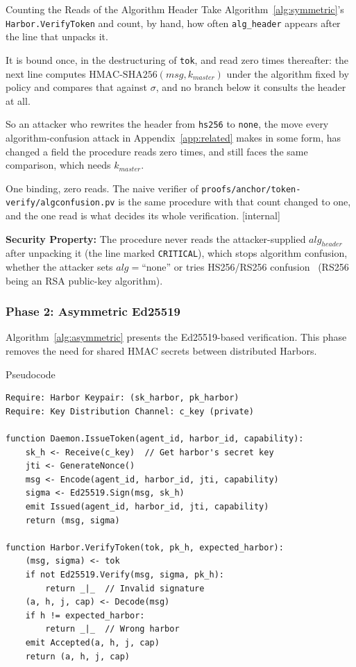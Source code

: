 \documentclass[11pt,a4paper]{article}
\theoremstyle{definition}
\begin{document}
\begin{pdexample}{Counting the Reads of the Algorithm Header}
\setlength{\parskip}{4pt plus 1pt}
Take Algorithm~\ref{alg:symmetric}'s \texttt{Harbor.VerifyToken} and count, by
hand, how often \texttt{alg\_header} appears after the line that unpacks it.

It is bound once, in the destructuring of \texttt{tok}, and read zero times
thereafter: the next line computes $\mathrm{HMAC\text{-}SHA256}(\mathit{msg},
k_{\mathit{master}})$ under the algorithm fixed by policy and compares that
against $\sigma$, and no branch below it consults the header at all.

So an
attacker who rewrites the header from \texttt{hs256} to \texttt{none}, the
move every algorithm-confusion attack in Appendix~\ref{app:related} makes in
some form, has changed a field the procedure reads zero times, and still faces
the same comparison, which needs $k_{\mathit{master}}$.

One binding, zero reads. The naive verifier of
\texttt{proofs/anchor/token-verify/}\allowbreak\texttt{algconfusion.pv} is the same procedure with
that count changed to one, and the one read is what decides its whole
verification. [internal]
\end{pdexample}

\textbf{Security Property:} The procedure never reads the attacker-supplied $alg_{header}$ after unpacking it (the line marked \texttt{CRITICAL}), which stops algorithm confusion, whether the attacker sets $alg = \text{``none''}$ or tries HS256/RS256 confusion~ (RS256 being an RSA public-key algorithm).

\subsubsection{Phase 2: Asymmetric Ed25519}

Algorithm~\ref{alg:asymmetric} presents the Ed25519-based verification. This phase removes the need for shared HMAC secrets between distributed Harbors.

\begin{pdlisting}{Pseudocode}{}
\begin{lstlisting}[style=pseudocode,caption={Algorithm 2: Asymmetric Harbor Verification (Ed25519)},label={alg:asymmetric}]
Require: Harbor Keypair: (sk_harbor, pk_harbor)
Require: Key Distribution Channel: c_key (private)

function Daemon.IssueToken(agent_id, harbor_id, capability):
    sk_h <- Receive(c_key)  // Get harbor's secret key
    jti <- GenerateNonce()
    msg <- Encode(agent_id, harbor_id, jti, capability)
    sigma <- Ed25519.Sign(msg, sk_h)
    emit Issued(agent_id, harbor_id, jti, capability)
    return (msg, sigma)

function Harbor.VerifyToken(tok, pk_h, expected_harbor):
    (msg, sigma) <- tok
    if not Ed25519.Verify(msg, sigma, pk_h):
        return _|_  // Invalid signature
    (a, h, j, cap) <- Decode(msg)
    if h != expected_harbor:
        return _|_  // Wrong harbor
    emit Accepted(a, h, j, cap)
    return (a, h, j, cap)
\end{lstlisting}
\end{pdlisting}
\end{document}
